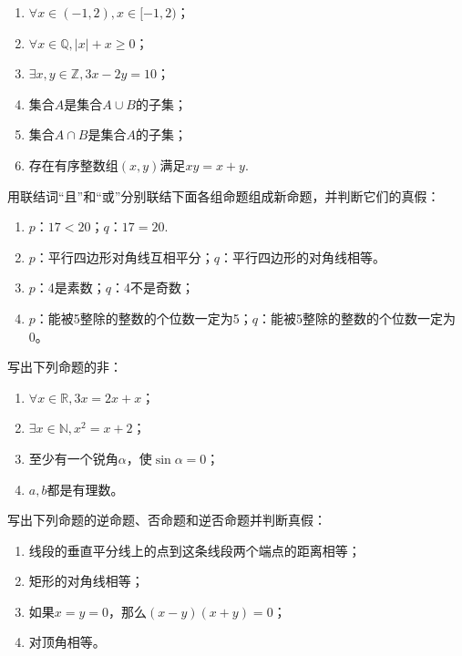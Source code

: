 \documentclass[lang=cn,math=cm,chinesefont=nofont,11pt,scheme=chinese,twocol]{elegantbook}
\begin{document}
\begin{enumerate}
  \item $\forall x\in(-1, 2), x\in[-1, 2)$；
  \item $\forall x\in\mathbb{Q}, |x|+x\geqslant0$；
  \item $\exists x,y\in\mathbb{Z},3x-2y=10$；
  \item 集合$A$是集合$A\cup B$的子集；
  \item 集合$A\cap B$是集合$A$的子集；
  \item 存在有序整数组$(x,y)$满足$xy=x+y$.
\end{enumerate}

\begin{exercise}
  用联结词“且”和“或”分别联结下面各组命题组成新命题，并判断它们的真假：
\end{exercise}

\begin{enumerate}
  \item $p$：$17<20$；$q$：$17=20$.
  \item $p$：平行四边形对角线互相平分；$q$：平行四边形的对角线相等。
  \item $p$：4是素数；$q$：4不是奇数；
  \item $p$：能被5整除的整数的个位数一定为5；$q$：能被5整除的整数的个位数一定为0。
\end{enumerate}

\begin{exercise}
  写出下列命题的非：
\end{exercise}

\begin{enumerate}
  \item $\forall x\in\mathbb{R},3x=2x+x$；
  \item $\exists x\in\mathbb{N},x^2=x+2$；
  \item 至少有一个锐角$\alpha$，使$\sin\alpha=0$；
  \item $a,b$都是有理数。
\end{enumerate}

\begin{exercise}
  写出下列命题的逆命题、否命题和逆否命题并判断真假：
\end{exercise}

\begin{enumerate}
  \item 线段的垂直平分线上的点到这条线段两个端点的距离相等；
  \item 矩形的对角线相等；
  \item 如果$x=y=0$，那么$(x-y)(x+y)=0$；
  \item 对顶角相等。
\end{enumerate}
\end{document}
